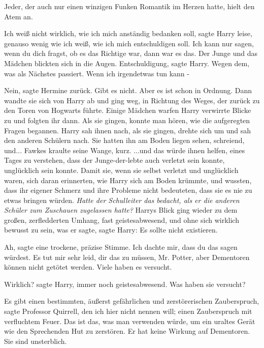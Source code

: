 Jeder, der auch nur einen winzigen Funken Romantik im Herzen hatte, hielt den
Atem an.

\glqq{}Ich weiß nicht wirklich, wie ich mich anständig bedanken soll\grqq{},
sagte Harry leise, \glqq{}genauso wenig wie ich weiß, wie ich mich entschuldigen
soll. Ich kann nur sagen, wenn du dich fragst, ob es das Richtige war, dann war
es das.\grqq{} Der Junge und das Mädchen blickten sich in die Augen. \glqq{}
Entschuldigung\grqq{}, sagte Harry. \glqq{}Wegen dem, was als Nächstes passiert.
Wenn ich irgendetwas tun kann -\grqq{}

\glqq{}Nein\grqq{}, sagte Hermine zurück. \glqq{}Gibt es nicht. Aber es ist schon
in Ordnung.\grqq{} Dann wandte sie sich von Harry ab und ging weg, in Richtung des
Weges, der zurück zu den Toren von Hogwarts führte. Einige Mädchen warfen Harry
verwirrte Blicke zu und folgten ihr dann. Als sie gingen, konnte man hören, wie
die aufgeregten Fragen begannen. Harry sah ihnen nach, als sie gingen, drehte
sich um und sah den anderen Schülern nach. Sie hatten ihn am Boden liegen sehen,
schreiend, und... Fawkes kraulte seine Wange, kurz. ...und das würde ihnen
helfen, eines Tages zu verstehen, dass der Junge-der-lebte auch verletzt sein
konnte, unglücklich sein konnte. Damit sie, wenn sie selbst verletzt und
unglücklich waren, sich daran erinnerten, wie Harry sich am Boden krümmte, und
wussten, dass ihr eigener Schmerz und ihre Probleme nicht bedeuteten, dass sie
es nie zu etwas bringen würden. \emph{ Hatte der Schulleiter das bedacht, als er
die anderen Schüler zum Zuschauen zugelassen hatte?} Harrys Blick ging wieder zu
dem großen, zerfledderten Umhang, fast geistesabwesend, und ohne sich wirklich
bewusst zu sein, was er sagte, sagte Harry: \glqq{}Es sollte nicht existieren.\grqq{}

\glqq{}Ah\grqq{}, sagte eine trockene, präzise Stimme. \glqq{}Ich dachte mir, dass
du das sagen würdest. Es tut mir sehr leid, dir das zu müssen, Mr. Potter, aber
Dementoren können nicht getötet werden. Viele haben es versucht.\grqq{}

\glqq{}Wirklich?\grqq{} sagte Harry, immer noch geistesabwesend. \glqq{}Was haben
sie versucht?\grqq{}

\glqq{}Es gibt einen bestimmten, äußerst gefährlichen und zerstörerischen
Zauberspruch\grqq{}, sagte Professor Quirrell, \glqq{}den ich hier nicht nennen
will; einen Zauberspruch mit verfluchtem Feuer. Das ist das, was man verwenden
würde, um ein uraltes Gerät wie den Sprechenden Hut zu zerstören. Er hat keine
Wirkung auf Dementoren. Sie sind unsterblich.\grqq{}


